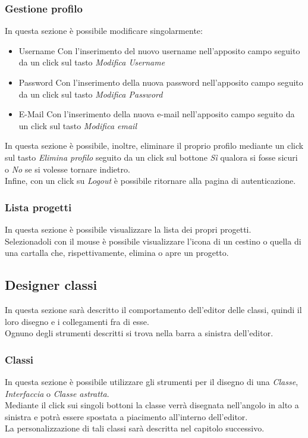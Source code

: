 		\subsubsection{Gestione profilo}
			In questa sezione  è possibile modificare singolarmente:
			\begin{itemize}
				\item Username
				Con l'inserimento del nuovo username nell'apposito campo seguito da un click sul tasto \emph{Modifica Username}
				\item Password
				Con l'inserimento della nuova password nell'apposito campo seguito da un click sul tasto \emph{Modifica Password}
				\item E-Mail
				Con l'inserimento della nuova e-mail nell'apposito campo seguito da un click sul tasto \emph{Modifica email}
			\end{itemize}
			In questa sezione è possibile, inoltre, eliminare il proprio profilo mediante un click sul tasto \emph{Elimina profilo} seguito
			da un click sul bottone \emph{Sì} qualora si fosse sicuri o \emph{No} se si volesse tornare indietro.\\
			Infine, con un click su \emph{Logout} è possibile ritornare alla pagina di autenticazione.
		\subsubsection{Lista progetti}
			In questa sezione è possibile visualizzare la lista dei propri progetti.\\
			Selezionadoli con il mouse è possibile visualizzare l'icona di un cestino o quella di una cartalla che, rispettivamente, elimina o apre un progetto.

	\subsection{Designer classi}
		In questa sezione sarà descritto il comportamento dell'editor delle classi, quindi il loro disegno e i collegamenti fra di esse.\\
		Ognuno degli strumenti descritti si trova nella barra a sinistra dell'editor.\\
		\subsubsection{Classi}
			In questa sezione  è possibile utilizzare gli strumenti per il disegno di una \emph{Classe}, \emph{Interfaccia} o \emph{Classe astratta}.\\
			Mediante il click sui singoli bottoni la classe verrà disegnata nell'angolo in alto a sinistra e potrà essere spostata a piacimento all'interno dell'editor.\\
			La personalizzazione di tali classi sarà descritta nel capitolo successivo.
